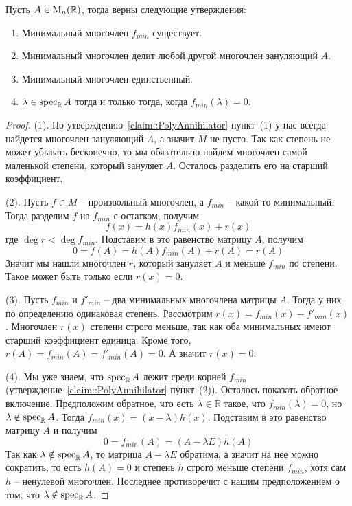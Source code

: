 \begin{claim}\label{claim::MinPoly}
Пусть $A\in \operatorname{M}_{n}(\mathbb R)$, тогда верны следующие утверждения:
\begin{enumerate}
\item Минимальный многочлен $f_{min}$ существует.

\item Минимальный многочлен делит любой другой многочлен зануляющий $A$.

\item Минимальный многочлен единственный.

\item $\lambda\in\operatorname{spec}_\mathbb R A$ тогда и только тогда, когда $f_{min}(\lambda) = 0$.
\end{enumerate}
\end{claim}
\begin{proof}
(1). По утверждению~\ref{claim::PolyAnnihilator} пункт~(1) у нас всегда найдется многочлен зануляющий $A$, а значит $M$ не пусто.  Так как степень не может убывать бесконечно, то мы обязательно найдем многочлен самой маленькой степени, который зануляет $A$. Осталось разделить его на старший коэффициент.

(2). Пусть $f\in M$ -- произвольный многочлен, а $f_{min}$ -- какой-то минимальный. Тогда разделим $f$ на $f_{min}$ с остатком, получим 
\[
f(x) = h(x)f_{min}(x) + r(x)
\]
где $\deg r < \deg f_{min}$. Подставим в это равенство матрицу $A$, получим
\[
0 = f(A) = h(A)f_{min}(A) + r(A) = r(A)
\]
Значит мы нашли многочлен $r$, который зануляет $A$ и меньше $f_{min}$ по степени. Такое может быть только если $r(x) = 0$.

(3). Пусть $f_{min}$ и $f'_{min}$ -- два минимальных многочлена матрицы $A$. Тогда у них по определению одинаковая степень. Рассмотрим $r(x) = f_{min}(x) - f'_{min}(x)$. Многочлен $r(x)$ степени строго меньше, так как оба минимальных имеют старший коэффициент единица. Кроме того, $r(A) = f_{min }(A) = f'_{min}(A) = 0$. А значит $r(x) = 0$. 

(4). Мы уже знаем, что $\operatorname{spec}_\mathbb RA$ лежит среди корней $f_{min}$ (утверждение~\ref{claim::PolyAnnihilator} пункт~(2)). Осталось показать обратное включение. Предположим обратное, что есть $\lambda\in \mathbb R$ такое, что $f_{min}(\lambda) = 0$, но $\lambda\notin\operatorname{spec}_\mathbb RA$. Тогда $f_{min}(x) = (x-\lambda)h(x)$. Подставим в это равенство матрицу $A$ и получим 
\[
0 = f_{min}(A) = (A - \lambda E)h(A)
\]
Так как $\lambda\notin\operatorname{spec}_\mathbb R A$, то матрица $A-\lambda E$ обратима, а значит на нее можно сократить, то есть $h(A) = 0$ и степень $h$ строго меньше степени $f_{min}$, хотя сам $h$ -- ненулевой многочлен. Последнее противоречит с нашим предположением о том, что $\lambda\notin\operatorname{spec}_\mathbb RA$.
\end{proof}

